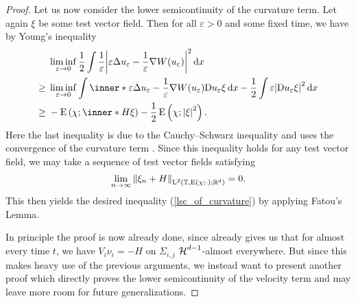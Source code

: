\begin{proof}
	Let us now consider the lower semicontinuity of the curvature 
	term. Let again $ \xi $ be some test vector field. Then for all $ 
	\varepsilon > 0 $ and some fixed time, we have by Young's inequality 
	\begin{align*}
		& 
		\liminf_{ \varepsilon \to 0 }
		\frac{ 1 }{ 2 }
		\int
			\frac{ 1 }{ \varepsilon }
			\abs{ 
				\varepsilon
				\Delta u_{ \varepsilon }
				-
				\frac{ 1 }{ \varepsilon }
				\nabla W ( u_{ \varepsilon } )
			}^{ 2 }
		\dd{ x }
		\\
		\geq{} &
		\liminf_{ \varepsilon \to 0 }
		\int
			\inner*{ 
				\varepsilon
				\Delta u_{ \varepsilon }
				-
				\frac{ 1 }{ \varepsilon }
				\nabla W ( u_{ \varepsilon } )
			}{
				\diff u_{ \varepsilon } \xi
			}
		\dd{ x }
		-
		\frac{ 1 }{ 2 }
		\int 
			\varepsilon
			\abs{ \diff u_{ \varepsilon } \xi }^{ 2 }
		\dd{ x }
		\\
		\geq{} &
		-\energy \left( \chi ; \inner*{ H }{ \xi } \right)
		-
		\frac{ 1 }{ 2 }
		\energy \left( \chi ; \abs{ \xi }^{ 2 } \right).
	\end{align*}
	Here the last inequality is due to the Cauchy--Schwarz inequality and uses 
	the convergence of the curvature term 
	.
	Since this inequality holds for any test vector field, we may take a 
	sequence of test vector fields satisfying
	\begin{equation*}
		\lim_{ n \to \infty }
			\norm{ \xi_{ n } + H }_{ \operatorname{L}^{ 2 } \left( \operatorname{\mathbb{T}} , \operatorname{E} 
			( 
			\chi ; \cdot ) ; \mathbb{ R }^{ d } \right) } 
		=
		0.
	\end{equation*}
	This then yields the desired inequality (\ref{lsc_of_curvature}) by 
	applying Fatou's Lemma.
	
	In principle the proof is now already done, since 
	 already gives us that for almost every 
	time $ t $, we have $ V_{ i } \nu_{ i } = - H $ on $ \Sigma_{ i , j 
	} $ $ \operatorname{\mathcal{H}}^{ d-  1 } $-almost everywhere. But since this makes heavy use of 
	the previous arguments, we instead want to present another proof which 
	directly proves the lower semicontinuity of the velocity term and may leave 
	more room for future generalizations.
	

\end{proof}
